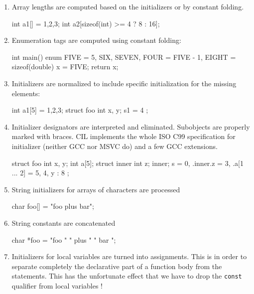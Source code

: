 \documentclass[letterpaper]{article}
\def\t#1{{\tt #1}}
\begin{document}
\begin{enumerate}
\item Array lengths are computed based on the initializers or by constant
folding.
\begin{cilcode}[global]
  int a1[] = {1,2,3};
  int a2[sizeof(int) >= 4 ? 8 : 16];
\end{cilcode}

\item Enumeration tags are computed using constant folding:
\begin{cilcode}[global]
int main() {
  enum {
     FIVE = 5,
     SIX, SEVEN,
     FOUR = FIVE - 1,
     EIGHT = sizeof(double)
  } x = FIVE;
 return x;
}

\end{cilcode}

\item Initializers are normalized to include specific initialization for the
missing elements:
\begin{cilcode}[global]
  int a1[5] = {1,2,3};
  struct foo { int x, y; } s1 = { 4 };
\end{cilcode}

\item Initializer designators are interpreted and eliminated. Subobjects are
properly marked with braces. CIL implements
the whole ISO C99 specification for initializer (neither GCC nor MSVC do) and
a few GCC extensions.
\begin{cilcode}[global]
  struct foo {
     int x, y;
     int a[5];
     struct inner {
        int z;
     } inner;
  } s = { 0, .inner.z = 3, .a[1 ... 2] = 5, 4, y : 8 };
\end{cilcode}

\item String initializers for arrays of characters are processed

\begin{cilcode}[global]
char foo[] = "foo plus bar";
\end{cilcode}

\item String constants are concatenated

\begin{cilcode}[global]
char *foo = "foo " " plus " " bar ";
\end{cilcode}

\item Initializers for local variables are turned into assignments. This is in
order to separate completely the declarative part of a function body from the
statements. This has the unfortunate effect that we have to drop the \t{const}
qualifier from local variables !


\end{enumerate}
\end{document}
